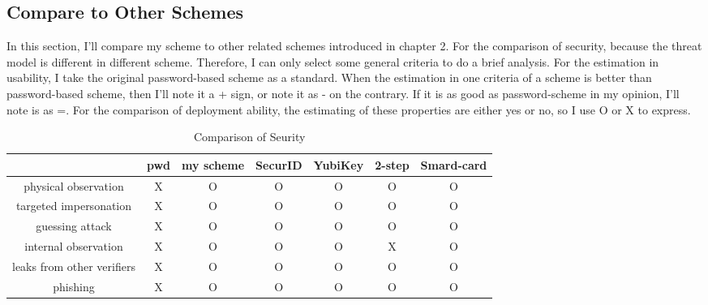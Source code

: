 \begin{CJK}{Bg5}{bsmi}


\chapter{Compare to Other Schemes}

In this section, I'll compare my scheme to other related schemes introduced in chapter 2. For the comparison of security, because the threat model is different in different scheme. Therefore, I can only select some general criteria to do a brief analysis. For the estimation in usability, I take the original password-based scheme as a standard. When the estimation in one criteria of a scheme is better than password-based scheme, then I'll note it a + sign, or note it as - on the contrary. If it is as good as password-scheme in my opinion, I'll note is as =. For the comparison of deployment ability, the estimating of these properties are either yes or no, so I use O or X to express.

\begin{table}[h]
\begin{tabular}{|c|c|c|c|c|c|c|}
\hline
                           & pwd & my scheme & SecurID & YubiKey & 2-step & Smard-card \\ \hline
physical observation       & X   & O         & O       & O       & O       & O          \\ \hline
targeted impersonation     & X   & O         & O       & O       & O       & O          \\ \hline
guessing attack            & X   & O         & O       & O       & O       & O          \\ \hline
internal observation       & X   & O         & O       & O       & X       & O          \\ \hline
leaks from other verifiers & X   & O         & O       & O       & O       & O          \\ \hline
phishing                   & X   & O         & O       & O       & O       & O          \\ \hline
\end{tabular}
\caption{Comparison of Seurity}
\end{table}


\end{CJK}
